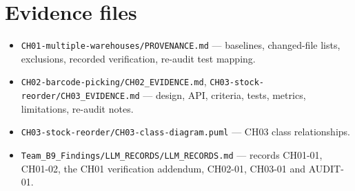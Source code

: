 \documentclass[11pt,a4paper]{article}
\newcommand{\code}[1]{\nolinkurl{#1}}
\begin{document}
\section{Evidence files}
\begin{itemize}[nosep]
\item \code{CH01-multiple-warehouses/PROVENANCE.md} --- baselines, changed-file lists, exclusions, recorded verification, re-audit test mapping.
\item \code{CH02-barcode-picking/CH02_EVIDENCE.md}, \code{CH03-stock-reorder/CH03_EVIDENCE.md} --- design, API, criteria, tests, metrics, limitations, re-audit notes.
\item \code{CH03-stock-reorder/CH03-class-diagram.puml} --- CH03 class relationships.
\item \code{Team_B9_Findings/LLM_RECORDS/LLM_RECORDS.md} --- records CH01-01, CH01-02, the CH01 verification addendum, CH02-01, CH03-01 and AUDIT-01.
\end{itemize}
\end{document}
